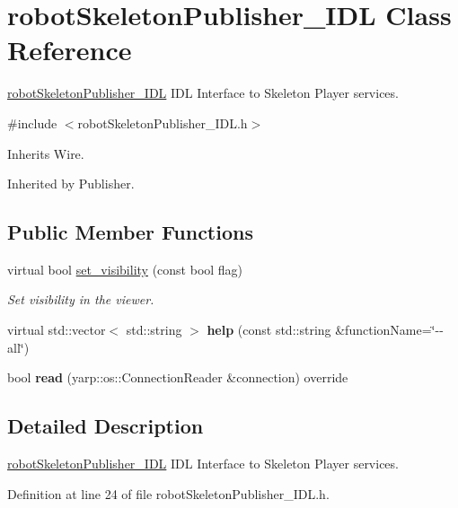 \section{robot\+Skeleton\+Publisher\+\_\+\+I\+DL Class Reference}
\label{classrobotSkeletonPublisher__IDL}


\hyperlink{classrobotSkeletonPublisher__IDL}{robot\+Skeleton\+Publisher\+\_\+\+I\+DL} I\+DL Interface to Skeleton Player services.  




{\ttfamily \#include $<$robot\+Skeleton\+Publisher\+\_\+\+I\+D\+L.\+h$>$}



Inherits Wire.



Inherited by Publisher.

\subsection*{Public Member Functions}
\begin{DoxyCompactItemize}
\item 
virtual bool \hyperlink{classrobotSkeletonPublisher__IDL_a4484695feff9f11dc7d773fe9a473612}{set\+\_\+visibility} (const bool flag)
\begin{DoxyCompactList}\small\item\em Set visibility in the viewer. \end{DoxyCompactList}\item 
\mbox{\label{classrobotSkeletonPublisher__IDL_ad4d418e9f3bbd17a9fe51b571ba038ae}} 
virtual std\+::vector$<$ std\+::string $>$ {\bfseries help} (const std\+::string \&function\+Name=\char`\"{}-\/-\/all\char`\"{})
\item 
\mbox{\label{classrobotSkeletonPublisher__IDL_a3aab583eae6be30406d9c373fcb6c723}} 
bool {\bfseries read} (yarp\+::os\+::\+Connection\+Reader \&connection) override
\end{DoxyCompactItemize}


\subsection{Detailed Description}
\hyperlink{classrobotSkeletonPublisher__IDL}{robot\+Skeleton\+Publisher\+\_\+\+I\+DL} I\+DL Interface to Skeleton Player services. 

Definition at line 24 of file robot\+Skeleton\+Publisher\+\_\+\+I\+D\+L.\+h.



